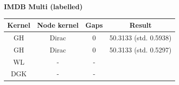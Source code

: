 \documentclass{article}
\begin{document}
\textbf{IMDB Multi (labelled)}\\
\begin{minipage}{0.6\linewidth}
	\hspace*{-1in}

	\label{fig:imdb_labelled}
\end{minipage}
\begin{minipage}[c]{0.5\linewidth}	
	\centering
	\begin{tabular}{c|c|c|c}
		Kernel & Node kernel & Gaps & Result\\
		\hline
		GH & Dirac & 0 & 50.3133 (std. 0.5938) \\
		GH & Dirac & 0 & 50.3133 (std. 0.5297) \\
		WL & - & - & \\
		DGK & - & - & \\
	\end{tabular}
	\label{table:imdb_multi_labelled}
\end{minipage}
\end{document}
